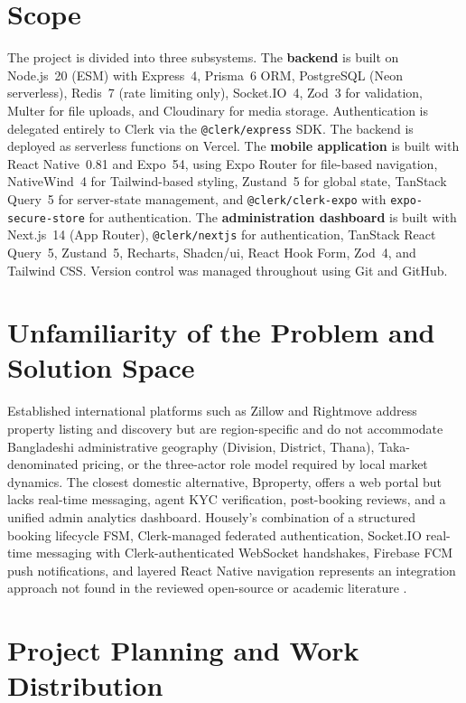 \documentclass[12pt,a4paper]{report}
\begin{document}
\section{Scope}

The project is divided into three subsystems. The \textbf{backend} is built on Node.js~20
(ESM) with Express~4, Prisma~6 ORM, PostgreSQL (Neon serverless), Redis~7 (rate
limiting only), Socket.IO~4, Zod~3 for validation, Multer for file uploads, and Cloudinary
for media storage. Authentication is delegated entirely to Clerk via the
\texttt{@clerk/express} SDK. The backend is deployed as serverless functions on Vercel.
The \textbf{mobile application} is built with React Native~0.81 and Expo~54, using
Expo Router for file-based navigation, NativeWind~4 for Tailwind-based styling,
Zustand~5 for global state, TanStack Query~5 for server-state management, and
\texttt{@clerk/clerk-expo} with \texttt{expo-secure-store} for authentication. The
\textbf{administration dashboard} is built with Next.js~14 (App Router),
\texttt{@clerk/nextjs} for authentication, TanStack React Query~5, Zustand~5, Recharts,
Shadcn/ui, React Hook Form, Zod~4, and Tailwind CSS. Version control was managed
throughout using Git and GitHub.

\section{Unfamiliarity of the Problem and Solution Space}

Established international platforms such as Zillow and Rightmove address property listing
and discovery but are region-specific and do not accommodate Bangladeshi administrative
geography (Division, District, Thana), Taka-denominated pricing, or the three-actor role
model required by local market dynamics. The closest domestic alternative, Bproperty,
offers a web portal but lacks real-time messaging, agent KYC verification, post-booking
reviews, and a unified admin analytics dashboard. Housely's combination of a structured
booking lifecycle FSM, Clerk-managed federated authentication, Socket.IO real-time
messaging with Clerk-authenticated WebSocket handshakes, Firebase FCM push
notifications, and layered React Native navigation represents an integration approach not
found in the reviewed open-source or academic literature \cite{richardson2007, brown2015}.

\section{Project Planning and Work Distribution}
\end{document}
